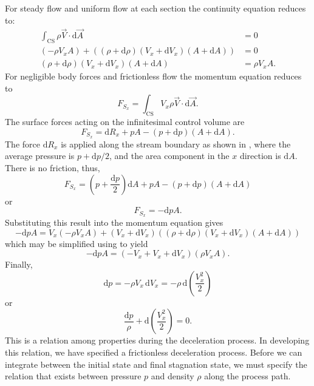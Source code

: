 For steady flow and uniform flow at each section the continuity equation reduces to:
\begin{align} \label{eq:coneq}
  \int_{\mathrm{CS}}\rho \Vec{V} \cdot \mathrm{d}\Vec{A} &= 0 \nonumber \\
  \left( - \rho V_x A \right) + \left( \left( \rho + \mathrm{d}\rho \right)\left( V_x + \mathrm{d}V_x \right)\left( A + \mathrm{d}A \right) \right) &= 0 \nonumber \\
  \left( \rho + \mathrm{d}\rho \right)\left( V_x + \mathrm{d}V_x \right)\left( A + \mathrm{d}A \right) &= \rho V_x A
.\end{align}
For negligible body forces and frictionless flow the momentum equation reduces to
\begin{equation*}
  F_{S_x} = \int_{\mathrm{CS}}V_x \rho \Vec{V} \cdot \mathrm{d}\Vec{A}
.\end{equation*}
The surface forces acting on the infinitesimal control volume are
\begin{equation*}
  F_{S_x} = \mathrm{d}R_x + p A - \left( p + \mathrm{d}p \right)\left( A + \mathrm{d}A \right)
.\end{equation*}
The force $\mathrm{d}R_x$ is applied along the stream boundary as shown in , where the average pressure is $p + \mathrm{d}p / 2$, and the area component in the $x$ direction is $\mathrm{d}A$.
There is no friction, thus,
\begin{equation*}
  F_{S_x} = \left( p + \frac{\mathrm{d}p}{2} \right)\mathrm{d}A + p A - \left( p + \mathrm{d}p \right) \left( A + \mathrm{d}A \right)
\end{equation*}
or
\begin{equation*}
  F_{S_x} = - \mathrm{d}p A
.\end{equation*}
Substituting this result into the momentum equation gives
\begin{equation*}
  - \mathrm{d}p A = V_x \left( - \rho V_x A \right) + \left( V_x + \mathrm{d}V_x \right) \left(  \left( \rho + \mathrm{d}\rho \right) \left( V_x + \mathrm{d}V_x \right) \left( A + \mathrm{d}A \right) \right)
\end{equation*}
which may be simplified using  to yield
\begin{equation*}
  - \mathrm{d}p A = \left( - V_x + V_x + \mathrm{d}V_x \right) \left( \rho V_x A \right)
.\end{equation*}
Finally,
\begin{equation*}
  \mathrm{d}p = - \rho V_x \, \mathrm{d}V_x = - \rho \, \mathrm{d} \left( \frac{V_x^2}{2} \right)
\end{equation*}
or
\begin{equation*}
  \frac{\mathrm{d}p}{\rho} + \mathrm{d}\left( \frac{V_x^2}{2} \right) = 0
.\end{equation*}
This is a relation among properties during the deceleration process.
In developing this relation, we have specified a frictionless deceleration process.
Before we can integrate between the initial state and final stagnation state, we must specify the relation that exists between pressure $p$ and density $\rho$ along the process path.

